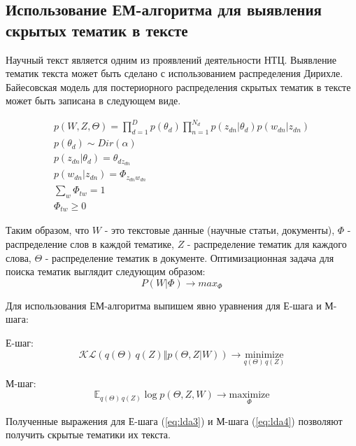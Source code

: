 \subsection{Использование ЕМ-алгоритма для выявления скрытых тематик в тексте}
Научный текст является одним из проявлений деятельности НТЦ. 
Выявление тематик текста может быть сделано с использованием распределения Дирихле. 
Байесовская модель для постериорного распределения скрытых тематик в тексте может быть записана в следующем виде.

\begin{eqnarray*} \label{eq:lda1}
p \left( W,Z,\Theta \right) = \prod_{d=1}^{D} p \left( \theta_d \right) \prod_{n=1}^{N_d} p \left( z_{dn} \vert \theta_d \right) p \left( w_{dn} \vert z_{dn} \right) \\
p \left( \theta_d \right) \sim Dir( \alpha ) \\
p \left( z_{dn} \vert \theta_d \right) = \theta_{dz_{dn}} \\
p \left( w_{dn} \vert z_{dn} \right) = \Phi_{z_{dn}w_{dn}} \\
\sum_w \Phi_{tw} = 1 \\
\Phi_{tw} \geqslant 0
\end{eqnarray*}

Таким образом, что $W$ - это текстовые данные (научные статьи, документы),  $\Phi$ - распределение слов в каждой тематике, $Z$ - распределение тематик для каждого слова, $\Theta$ - распределение тематик в документе.
Оптимизационная задача для поиска тематик выглядит следующим образом: 
\begin{equation} \label{eq:lda2}
P(W \vert \Phi) \rightarrow max_\Phi
\end{equation}

Для использования ЕМ-алгоритма выпишем явно уравнения для Е-шага и М-шага:

Е-шаг:
\begin{equation}\label{eq:lda3}
\mathcal{KL} (q(\Theta) \, q(Z)  \Vert   p \left( \Theta,Z \vert W \right) ) \rightarrow \underset{q(\Theta) \, q(Z)} {\text{minimize}}
\end{equation}

М-шаг:
\begin{equation}\label{eq:lda4}
\mathbb{E}_{q(\Theta) \, q(Z)} \log p \left( \Theta,Z,W \right) \rightarrow \underset{\Phi}{\text{maximize}}
\end{equation}

Полученные выражения для Е-шага (\ref{eq:lda3}) и М-шага (\ref{eq:lda4}) позволяют получить скрытые тематики их текста. 

